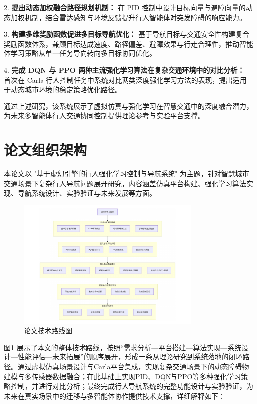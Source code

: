 2. \textbf{提出动态加权融合路径规划机制：} 在 PID 控制中设计目标向量与避障向量的动态加权机制，结合雷达感知与环境反馈提升行人智能体对突发障碍的响应能力。

3. \textbf{构建多维奖励函数促进多目标导航优化：} 基于导航目标与交通安全性构建复合奖励函数体系，兼顾目标达成速度、路径偏差、避障效果与行走合理性，推动智能体学习策略从单一任务导向转向多目标协同优化。

4. \textbf{完成 DQN 与 PPO 两种主流强化学习算法在复杂交通环境中的对比分析：} 首次在 Carla 行人控制任务中系统对比两类深度强化学习方法的表现，提出适用于动态城市环境的稳定策略优化路径。

通过上述研究，该系统展示了虚拟仿真与强化学习在智慧交通中的深度融合潜力，为未来多智能体行人交通协同控制提供理论参考与实验平台支撑。

\section{论文组织架构}

本论文以 "基于虚幻引擎的行人强化学习控制与导航系统" 为主题，针对智慧城市交通场景下复杂行人导航问题展开研究，内容涵盖仿真平台构建、强化学习算法实现、导航系统设计、实验验证与未来发展等方面。

\begin{figure}[H]
    \centering
    \includegraphics[width=0.8\textwidth]{images/tech_route.pdf}
    \caption{论文技术路线图}
    \label{fig:techroute}
\end{figure}

图\ref{fig:techroute} 展示了本文的整体技术路线，按照“需求分析—平台搭建—算法实现—系统设计—性能评估—未来拓展”的顺序展开，形成一条从理论研究到系统落地的闭环路径。通过虚拟仿真场景设计与Carla平台集成，实现复杂交通场景下的动态障碍物建模与多传感器数据融合；在此基础上实现PID、DQN与PPO等多种强化学习策略控制，并进行对比分析；最终完成行人导航系统的完整功能设计与实验验证，为未来在真实场景中的迁移与多智能体协作提供技术支撑，详细解释如下：


